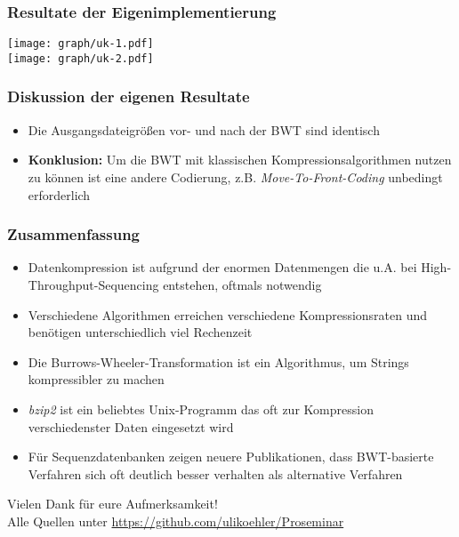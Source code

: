 \documentclass[14pt,xcolor=dvipsnames,pdftex]{beamer}
\begin{document}
\begin{frame}[allowframebreaks]
 \frametitle{Resultate der Eigenimplementierung}
 \texttt{[image: graph/uk-1.pdf]}
 \framebreak\\
 \texttt{[image: graph/uk-2.pdf]}
\end{frame}
\begin{frame}
 \frametitle{Diskussion der eigenen Resultate}
 \begin{itemize}
  \item Die Ausgangsdateigrößen vor- und nach der BWT sind identisch
  \item \textbf{Konklusion:} Um die BWT mit klassischen Kompressionsalgorithmen nutzen zu können ist eine andere Codierung, z.B. \textit{Move-To-Front-Coding} unbedingt erforderlich
 \end{itemize}

\end{frame}

\begin{frame}[allowframebreaks]
 \frametitle{Zusammenfassung}
 \begin{itemize}
  \item Datenkompression ist aufgrund der enormen Datenmengen die u.A. bei High-Throughput-Sequencing entstehen, oftmals notwendig
  \item Verschiedene Algorithmen erreichen verschiedene Kompressionsraten und benötigen unterschiedlich viel Rechenzeit
 \end{itemize}
 \framebreak
 \begin{itemize}
  \item Die Burrows-Wheeler-Transformation ist ein Algorithmus, um Strings kompressibler zu machen
  \item \textit{bzip2} ist ein beliebtes Unix-Programm das oft zur Kompression verschiedenster Daten eingesetzt wird
  \item Für Sequenzdatenbanken zeigen neuere Publikationen, dass BWT-basierte Verfahren sich oft deutlich besser verhalten als alternative Verfahren
 \end{itemize}
\end{frame}
\begin{frame}
 \begin{center}
  {\color{BlueViolet}\large Vielen Dank für eure Aufmerksamkeit!}\\\vspace{1cm}
  Alle Quellen unter \url{https://github.com/ulikoehler/Proseminar}
 \end{center}

\end{frame}
\end{document}
